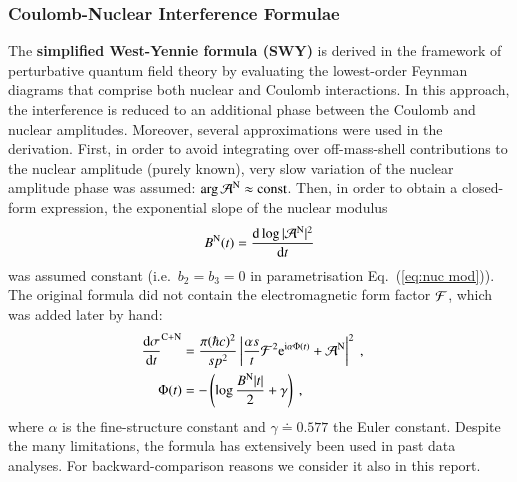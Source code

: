 \subsubsection{Coulomb-Nuclear Interference Formulae}
\label{sec:cni interference}

The {\bf simplified West-Yennie formula (SWY)} \cite{wy68} is derived in the framework of perturbative quantum field theory by evaluating the lowest-order Feynman diagrams that comprise both nuclear and Coulomb interactions. In this approach, the interference is reduced to an additional phase between the Coulomb and nuclear amplitudes. Moreover, several approximations were used in the derivation. First, in order to avoid integrating over off-mass-shell contributions to the nuclear amplitude (purely known), very slow variation of the nuclear amplitude phase was assumed: $\arg {\cal A}^{\rm N} \approx \hbox{const}$. Then, in order to obtain a closed-form expression, the exponential slope of the nuclear modulus
\begin{equation}
\label{eq:nuc slope}
B^{\rm N}(t) = {\d \log |{\cal A}^{\rm N}|^2 \over \d t}
\end{equation}
was assumed constant (i.e.~$b_2 = b_3 = 0$ in parametrisation Eq.~(\ref{eq:nuc mod})). The original formula did not contain the electromagnetic form factor ${\cal F}$, which was added later by hand:
\begin{equation}
\label{eq:int swy}
	\begin{aligned}
		{\d\sigma\over \d t}^{\rm C+N} &= {\pi (\hbar c)^2 \over s p^2} \left | {\alpha s\over t} {\cal F}^2 \e^{\I\alpha \Phi(t)} + {\cal A}^{\rm N} \right |^2\ ,\cr
		\Phi(t) &= - \left( \log {B^{\rm N} |t|\over 2} + \gamma \right)\ ,\cr
	\end{aligned}
\end{equation}
where $\alpha$ is the fine-structure constant and $\gamma \doteq 0.577$ the Euler constant. Despite the many limitations, the formula has extensively been used in past data analyses. For backward-comparison reasons we consider it also in this report.

